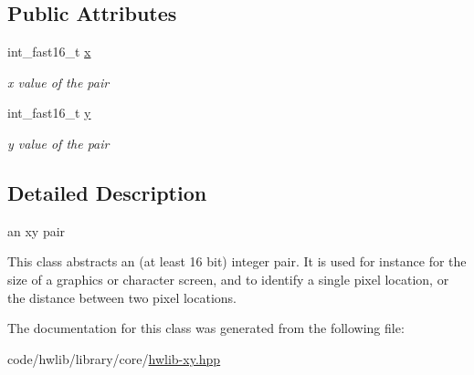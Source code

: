 \subsection*{Public Attributes}
\begin{DoxyCompactItemize}
\item 
\mbox{\label{classhwlib_1_1xy_a7f7c8b3888ce9d2ba014b8d36a86abb1}} 
int\+\_\+fast16\+\_\+t \hyperlink{classhwlib_1_1xy_a7f7c8b3888ce9d2ba014b8d36a86abb1}{x}
\begin{DoxyCompactList}\small\item\em x value of the pair \end{DoxyCompactList}\item 
\mbox{\label{classhwlib_1_1xy_a6a665ea6d31ce71d9f3a533986744086}} 
int\+\_\+fast16\+\_\+t \hyperlink{classhwlib_1_1xy_a6a665ea6d31ce71d9f3a533986744086}{y}
\begin{DoxyCompactList}\small\item\em y value of the pair \end{DoxyCompactList}\end{DoxyCompactItemize}


\subsection{Detailed Description}
an xy pair

This class abstracts an (at least 16 bit) integer pair. It is used for instance for the size of a graphics or character screen, and to identify a single pixel location, or the distance between two pixel locations. 

The documentation for this class was generated from the following file\+:\begin{DoxyCompactItemize}
\item 
code/hwlib/library/core/\hyperlink{hwlib-xy_8hpp}{hwlib-\/xy.\+hpp}\end{DoxyCompactItemize}
